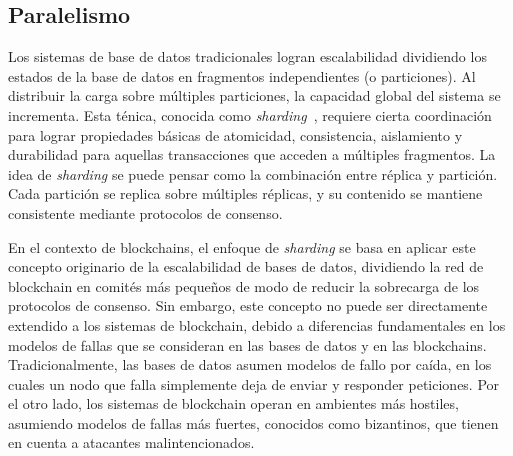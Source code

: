 

\subsection{Paralelismo}
Los sistemas de base de datos tradicionales logran escalabilidad dividiendo
los estados de la base de datos en fragmentos independientes (o particiones).
%
Al distribuir la carga sobre múltiples particiones, la capacidad global del sistema
se incrementa.
%
Esta ténica, conocida como \emph{sharding}~\cite{Dang2019Sharding}, requiere cierta coordinación para lograr propiedades
básicas de atomicidad, consistencia, aislamiento y durabilidad para aquellas transacciones
que acceden a múltiples fragmentos.
%
%
La idea de \emph{sharding} se puede pensar como la combinación entre réplica y partición.
%
Cada partición se replica sobre múltiples réplicas, y su contenido se mantiene consistente
mediante protocolos de consenso.

En el contexto de blockchains, el enfoque de \emph{sharding} se basa en aplicar este concepto
originario de la escalabilidad de bases de datos, dividiendo la red de blockchain en comités más
pequeños de modo de reducir la sobrecarga de los protocolos de consenso.
%
Sin embargo, este concepto no puede ser directamente extendido a los sistemas de blockchain, debido
a diferencias fundamentales en los modelos de fallas que se consideran en las bases de datos
y en las blockchains.
%
Tradicionalmente, las bases de datos asumen modelos de fallo por caída, en los cuales un nodo que falla
simplemente deja de enviar y responder peticiones.
%
Por el otro lado, los sistemas de blockchain operan en ambientes más hostiles, asumiendo modelos de fallas
más fuertes, conocidos como bizantinos, que tienen en cuenta a atacantes malintencionados.
%

